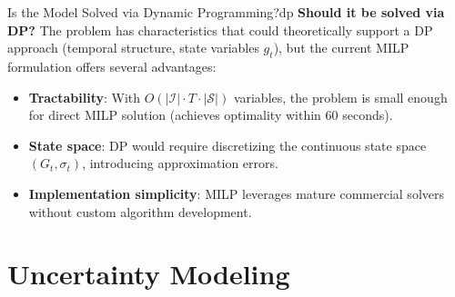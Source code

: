 \documentclass[11pt,a4paper]{article}
\begin{document}
\begin{questionbox}{Is the Model Solved via Dynamic Programming?}{dp}
\textbf{Should it be solved via DP?} The problem has characteristics that could theoretically support a DP approach (temporal structure, state variables $g_t$), but the current MILP formulation offers several advantages:
\begin{itemize}
    \item \textbf{Tractability}: With $O(|\mathcal{I}| \cdot T \cdot |\mathcal{S}|)$ variables, the problem is small enough for direct MILP solution (achieves optimality within 60 seconds).
    \item \textbf{State space}: DP would require discretizing the continuous state space $(G_t, \sigma_t)$, introducing approximation errors.
    \item \textbf{Implementation simplicity}: MILP leverages mature commercial solvers without custom algorithm development.
\end{itemize}
\end{questionbox}

\section{Uncertainty Modeling}
\end{document}
